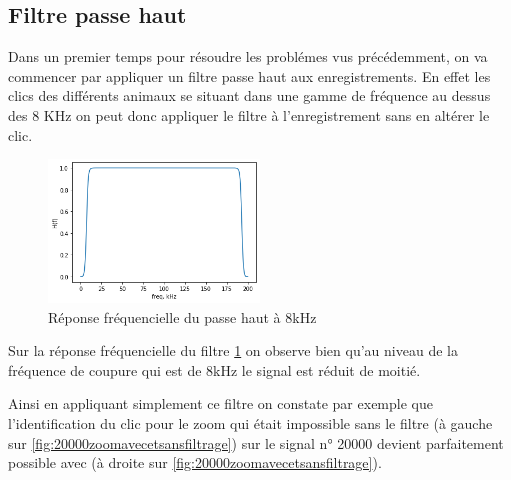 \hypertarget{Filtre-passe-haut}{%
\subsection{Filtre passe haut}
\label{Filtre-passe-haut}}

Dans un premier temps pour résoudre les problémes vus précédemment, on  va commencer par appliquer un filtre passe haut aux enregistrements. En effet les clics des différents animaux se situant dans une gamme de fréquence au dessus des 8 KHz on peut donc appliquer le filtre à l'enregistrement sans en altérer le clic.

\begin{figure}[!h]
\centering
\includegraphics[width=0.5\textwidth]{./images/reponseEnFrequencePH8kHz.png}
\caption{Réponse fréquencielle du passe haut à 8kHz%
\label{fig:reponseEnFrequencePH8kHz}}
\end{figure}
Sur la réponse fréquencielle du filtre \ref{fig:reponseEnFrequencePH8kHz} on observe bien qu'au niveau de la fréquence de coupure qui est de 8kHz le signal est réduit de moitié.

Ainsi en appliquant simplement ce filtre on constate par exemple que l'identification du clic pour le zoom qui était impossible sans le filtre (à gauche sur \ref{fig:20000zoomavecetsansfiltrage}) sur le signal n° 20000 devient parfaitement possible avec (à droite sur \ref{fig:20000zoomavecetsansfiltrage}).

